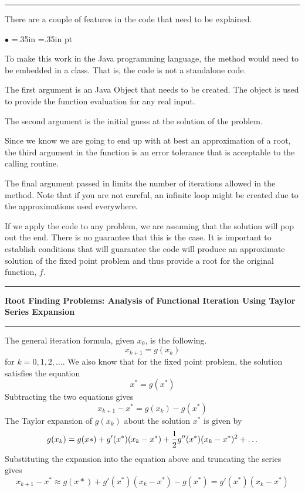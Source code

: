 \documentclass[10pt,fleqn]{article}
\begin{document}
\vskip0.1in\hrule\vskip0.1in
\noindent
There are a couple of features in the code that need to be explained.
\begin{list}{$\bullet$}{ \parsep=0pt \listparindent=0pt
\topsep=0pt \rightmargin=.35in \leftmargin=.35in  pt
\itemsep=2pt}
  \item To make this work in the Java programming language, the method would
        need to be embedded in a class. That is, the code is not a standalone
        code.
  \item The first argument is an Java Object that needs to be created. The
        object is used to provide the function evaluation for any real input.
  \item The second argument is the initial guess at the solution of the problem.
  \item Since we know we are going to end up with at best an approximation of
        a root, the third argument in the function is an error tolerance that is
        acceptable to the calling routine.
  \item The final argument passed in limits the number of iterations allowed in
        the method. Note that if you are not careful, an infinite loop might be
        created due to the approximations used everywhere.
\end{list}
If we apply the code to any problem, we are assuming that the solution will pop
out the end. There is no guarantee that this is the case. It is important to
establish conditions that will guarantee the code will produce an approximate
solution of the fixed point problem and thus provide a root for the original
function, $f$.
\vskip0.1in\hrule\vskip0.1in
\noindent
{\bf Root Finding Problems: Analysis of Functional Iteration Using Taylor
 Series Expansion} 
\vskip0.1in\hrule\vskip0.1in
\noindent
The general iteration formula, given $x_0$, is the following.
$$
  x_{k+1} = g(x_k)
$$
for $k=0,1,2,\ldots$. We also know that for the fixed point problem, the
solution satisfies the equation
$$
  x^* = g(x^*)
$$
Subtracting the two equations gives
$$
  x_{k+1} - x^* = g(x_k) - g(x^*)
$$
The Taylor expansion of $g(x_k)$ about the solution $x^*$ is given by
$$
  g(x_k) = g(x*) + g'(x^*) ( x_k - x^* ) + {1\over 2} g''(x^*) ( x_k - x^* )^2
              + \ldots
$$
Substituting the expansion into the equation above and truncating the series
gives
$$
  x_{k+1} - x^* \approx g(x*) + g'(x^*) ( x_k - x^* ) - g(x^*)
                       = g'(x^*) ( x_k - x^* )
$$
\end{document}
